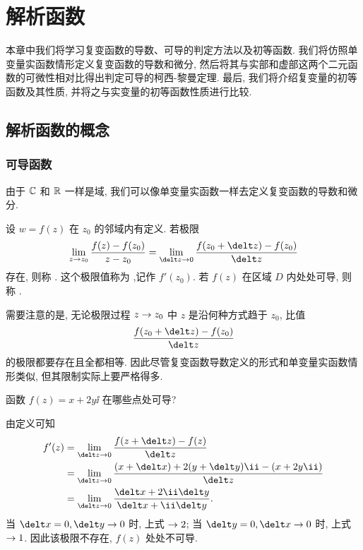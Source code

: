 \chapter{解析函数}
\label{chapter:2}

本章中我们将学习复变函数的导数、可导的判定方法以及初等函数.
我们将仿照单变量实函数情形定义复变函数的导数和微分, 然后将其与实部和虚部这两个二元函数的可微性相对比得出判定可导的柯西-黎曼定理.
最后, 我们将介绍复变量的初等函数及其性质, 并将之与实变量的初等函数性质进行比较.

\section{解析函数的概念}

\subsection{可导函数}

由于 ${\mathbb{C}}$ 和 ${\mathbb{R}}$ 一样是域, 我们可以像单变量实函数一样去定义复变函数的导数和微分.

\begin{definition}
  设 $w=f(z)$ 在 $z_0$ 的邻域内有定义.
  若极限
  \[
     \lim_{z\ra z_0}\frac{f(z)-f(z_0)}{z-z_0}
    =\lim_{\delt z\ra 0}\frac{f(z_0+\delt z)-f(z_0)}{\delt z}
  \]
  存在, 则称 .
  这个极限值称为 ,记作 $f'(z_0)$.
  若 $f(z)$ 在区域 $D$ 内处处可导, 则称 .\footnotemark
\end{definition}


需要注意的是, 无论极限过程 $z\rightarrow z_0$ 中 $z$ 是沿何种方式趋于 $z_0$, 比值
\[
  \frac{f(z_0+\delt z)-f(z_0)}{\delt z}
\]
的极限都要存在且全都相等.
因此尽管复变函数导数定义的形式和单变量实函数情形类似, 但其限制实际上要严格得多.

\begin{example}
  函数 $f(z)=x+2y\ii$ 在哪些点处可导?
\end{example}

\begin{solution}
  由定义可知
  \begin{align*}
     f'(z)&
    =\lim_{\delt z\ra 0}\frac{f(z+\delt z)-f(z)}{\delt z}\\&
    =\lim_{\delt z\ra 0}\frac{(x+\delt x)+2(y+\delt y)\ii-(x+2y\ii)}{\delt z}\\&
    =\lim_{\delt z\ra 0}\frac{\delt x+2\ii\delt y}{\delt x+\ii\delt y}.
  \end{align*}
  当 $\delt x=0, \delt y\ra 0$ 时, 上式 $\rightarrow2$; 
  当 $\delt y=0, \delt x\ra 0$ 时, 上式 $\rightarrow1$.
  因此该极限不存在, $f(z)$ 处处不可导.
\end{solution}

